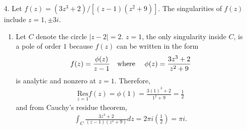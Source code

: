 \documentclass[a4paper,12pt]{article}
\begin{document}
\begin{enumerate}
    \item[4.]
        Let $f(z) = (3z^3 + 2)/[(z - 1)(z^2 + 9)]$. The singularities of $f(z)$ include $z = 1, \pm 3i$.
        \begin{enumerate}
            \item
                Let $C$ denote the circle $|z - 2| = 2$. $z = 1$, the only singularity inside $C$, is a pole of order $1$ because $f(z)$ can be written in the form
                \begin{align*}
                    f(z) = \frac{\phi(z)}{z - 1}
                    \text{\quad where \quad}
                    \phi(z) = \frac{3z^3 + 2}{z^2 + 9}
                \end{align*}
                is analytic and nonzero at $z = 1$. Therefore,
                \begin{align*}
                    \underset{z = 1}{\text{Res}} f(z) = \phi(1) = \frac{3(1)^3 + 2}{1^2 + 9} = \frac{1}{2}
                \end{align*}
                and from Cauchy's residue theorem,
                \begin{align*}
                    \int_C \frac{3z^3 + 2}{(z - 1)(z^2 + 9)} dz = 2\pi i \left( \frac{1}{2} \right) = \pi i.
                \end{align*}


\end{enumerate}
\end{enumerate}
\end{document}
